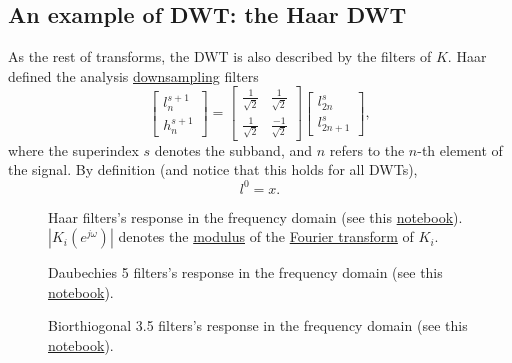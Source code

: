 \subsection{An example of DWT: the Haar DWT}
As the rest of transforms, the DWT is also described by the filters of
$K$. Haar defined the analysis
\href{https://en.wikipedia.org/wiki/Downsampling_(signal_processing)}{downsampling}
filters
\begin{equation}
  \begin{bmatrix}
    l^{s+1}_n \\
    h^{s+1}_n
  \end{bmatrix}
  = 
  \begin{bmatrix} \frac{1}{\sqrt{2}} & \frac{1}{\sqrt{2}} \\ \frac{1}{\sqrt{2}} & \frac{-1}{\sqrt{2}} \end{bmatrix}
  \begin{bmatrix}
    l^s_{2n} \\
    l^s_{2n+1}
  \end{bmatrix},
  \label{eq:Haar_transform}
\end{equation}
where the superindex $s$ denotes the subband, and $n$ refers to the
$n$-th element of the signal. By definition (and notice that this
holds for all DWTs),
\begin{equation}
  l^0=x.
\end{equation}

\begin{figure}
  \centering
  \caption{Haar filters's response in the frequency domain (see this
    \href{https://github.com/Sistemas-Multimedia/Sistemas-Multimedia.github.io/blob/master/study_guide/05-DWT/dwt_filters_analysis.ipynb}{notebook}).
    $|K_i(e^{j\omega})|$ denotes the
    \href{https://en.wikipedia.org/wiki/Absolute_value}{modulus} of
    the \href{https://en.wikipedia.org/wiki/Fourier_transform}{Fourier
      transform} of $K_i$.}
  \label{fig:Haar_modulus}
\end{figure}

\begin{figure}
  \centering
  \caption{Daubechies 5 filters's response in the frequency domain
    (see this
    \href{https://github.com/Sistemas-Multimedia/Sistemas-Multimedia.github.io/blob/master/study_guide/05-DWT/dwt_filters_analysis.ipynb}{notebook}).}
  \label{fig:db5_modulus}
\end{figure}

\begin{figure}
  \centering
  \caption{Biorthiogonal 3.5 filters's response in the frequency
    domain (see this
    \href{https://github.com/Sistemas-Multimedia/Sistemas-Multimedia.github.io/blob/master/study_guide/05-DWT/dwt_filters_analysis.ipynb}{notebook}).}
  \label{fig:bior3.5_modulus}
\end{figure}

